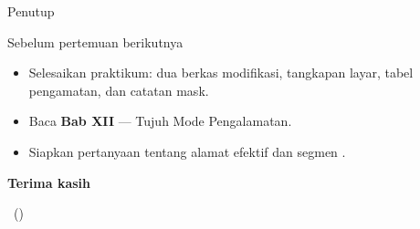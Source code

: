 \documentclass[aspectratio=169,11pt]{beamer}
\begin{document}
\begin{frame}{Penutup}
\begin{block}{Sebelum pertemuan berikutnya}
\small
\begin{itemize}
    \item Selesaikan praktikum: dua berkas  modifikasi,
          tangkapan layar, tabel pengamatan, dan catatan mask.
    \item Baca \textbf{Bab XII} — Tujuh Mode Pengalamatan.
    \item Siapkan pertanyaan tentang alamat efektif dan segmen
          .
\end{itemize}
\end{block}

\vspace{0.4em}
\begin{center}
{\color{obeBlue}\sffamily\large\bfseries Terima kasih\par}
\vspace{0.15em}
{\color{obeGray}\sffamily\small \NamaMK\ (\KodeMK)
\textbullet\ \SemesterTeks\par}
\end{center}
\end{frame}
\end{document}
